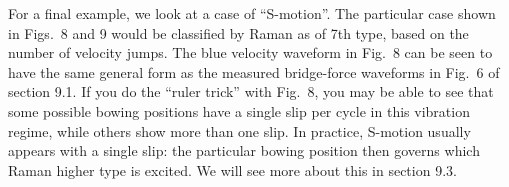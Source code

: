   For a final example, we look at a case of ``S-motion''. The particular case 
  shown in Figs.\ 8 and 9 would be classified by Raman as of 7th type, based on 
  the number of velocity jumps. The blue velocity waveform in Fig.\ 8 can be 
  seen to have the same general form as the measured bridge-force waveforms in 
  Fig.\ 6 of section 9.1. If you do the ``ruler trick'' with Fig.\ 8, you may 
  be able to see that some possible bowing positions have a single slip per 
  cycle in this vibration regime, while others show more than one slip. In 
  practice, S-motion usually appears with a single slip: the particular bowing 
  position then governs which Raman higher type is excited. We will see more 
  about this in section 9.3. 